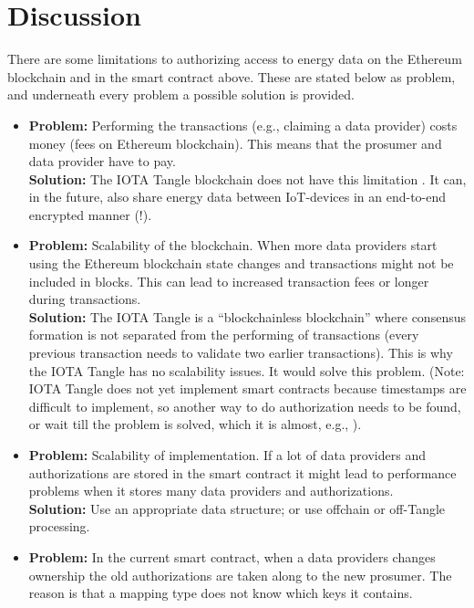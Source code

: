 \documentclass[paper=a4, fontsize=11pt]{scrartcl}
\numberwithin{equation}{section} %
\numberwithin{figure}{section}   %
\numberwithin{table}{section}    %
\begin{document}
\section{Discussion}
\label{discussion}

There are some limitations to authorizing access to energy data on the Ethereum
blockchain and in the smart contract above. These are stated below as problem,
and underneath every problem a possible solution is provided.

\begin{itemize}
\item \textbf{Problem:} Performing the transactions (e.g., claiming a data
  provider) costs money (fees on Ethereum blockchain). This means that the
  prosumer and data provider have to pay. \\\textbf{Solution:} The IOTA Tangle
  blockchain does not have this limitation \cite{iota}. It can, in the future,
  also share energy data between IoT-devices in an end-to-end encrypted manner
  \cite{iotamam} (!).
\item \textbf{Problem:} Scalability of the blockchain. When more data providers
  start using the Ethereum blockchain state changes and transactions might not
  be included in blocks. This can lead to increased transaction fees or longer
  during transactions. \\\textbf{Solution:} The IOTA Tangle \cite{iota} is a
  ``blockchainless blockchain'' where consensus formation is not separated from
  the performing of transactions (every previous transaction needs to validate
  two earlier transactions). This is why the IOTA Tangle has no scalability
  issues. It would solve this problem. (Note: IOTA Tangle does not yet implement
  smart contracts because timestamps are difficult to implement, so another way
  to do authorization needs to be found, or wait till the problem is solved,
  which it is almost, e.g., \cite{iotatimestamps}).
\item \textbf{Problem:} Scalability of implementation. If a lot of data
  providers and authorizations are stored in the smart contract it might lead to
  performance problems when it stores many data providers and authorizations.
  \\\textbf{Solution:} Use an appropriate data structure; or use offchain or
  off-Tangle processing.
\item \textbf{Problem:} In the current smart contract, when a data providers
  changes ownership the old authorizations are taken along to the new prosumer.
  The reason is that a mapping type does not know which keys it contains.

\end{itemize}
\end{document}
